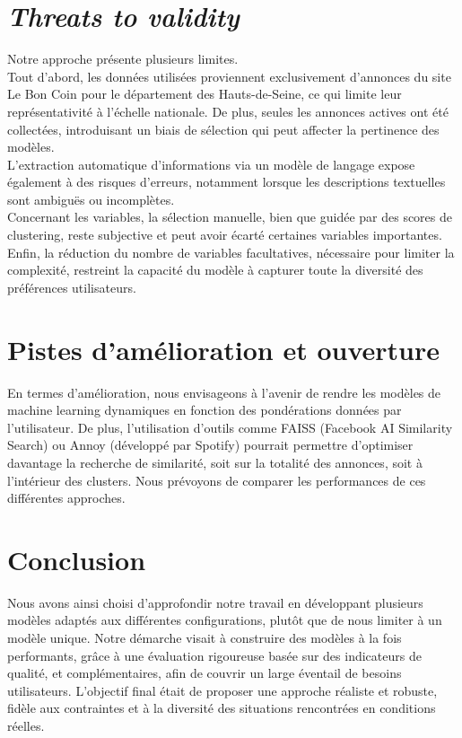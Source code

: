 \documentclass[a4paper, 12pt, twoside]{report}
\begin{document}
	\section{\textit{Threats to validity}}
	
	Notre approche présente plusieurs limites. \\

	Tout d’abord, les données utilisées proviennent exclusivement d’annonces du site Le Bon Coin pour le département des Hauts-de-Seine, ce qui limite leur représentativité à l’échelle nationale. De plus, seules les annonces actives ont été collectées, introduisant un biais de sélection qui peut affecter la pertinence des modèles. \\

	L’extraction automatique d’informations via un modèle de langage expose également à des risques d’erreurs, notamment lorsque les descriptions textuelles sont ambiguës ou incomplètes. \\

	Concernant les variables, la sélection manuelle, bien que guidée par des scores de clustering, reste subjective et peut avoir écarté certaines variables importantes. Enfin, la réduction du nombre de variables facultatives, nécessaire pour limiter la complexité, restreint la capacité du modèle à capturer toute la diversité des préférences utilisateurs.
	
	\section{Pistes d’amélioration et ouverture}
	
	En termes d’amélioration, nous envisageons à l'avenir de rendre les modèles de machine learning dynamiques en fonction des pondérations données par l'utilisateur. De plus, l'utilisation d’outils comme FAISS (Facebook AI Similarity Search) ou Annoy (développé par Spotify) pourrait permettre d'optimiser davantage la recherche de similarité, soit sur la totalité des annonces, soit à l’intérieur des clusters. Nous prévoyons de comparer les performances de ces différentes approches.
	
	\section{Conclusion}
	
	Nous avons ainsi choisi d’approfondir notre travail en développant plusieurs modèles adaptés aux différentes configurations, plutôt que de nous limiter à un modèle unique. Notre démarche visait à construire des modèles à la fois performants, grâce à une évaluation rigoureuse basée sur des indicateurs de qualité, et complémentaires, afin de couvrir un large éventail de besoins utilisateurs. L'objectif final était de proposer une approche réaliste et robuste, fidèle aux contraintes et à la diversité des situations rencontrées en conditions réelles.
\end{document}
